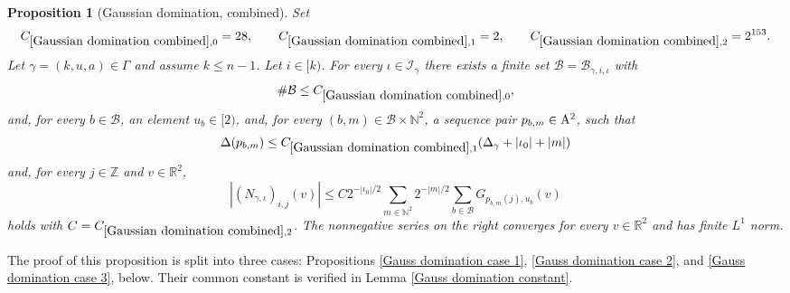 \documentclass[12pt,reqno]{amsart}
\theoremstyle{plain}
\newtheorem{proposition}[theorem]{Proposition}
\numberwithin{equation}{section}
\theoremstyle{remark}
\newcommand{\uses}[1]{}
\newcommand{\usesdefs}[1]{}
\newcommand{\Z}{{\mathbb Z}}
\newcommand{\R}{{\mathbb R}}
\newcommand{\N}{{\mathbb N}}
\begin{document}
\begin{proposition}[Gaussian domination, combined]\label{Gaussian domination combined}\uses{Gauss domination case 1,Gauss domination case 2,Gauss domination case 3,Gauss domination constant}\usesdefs{multiplicatively spaced monotone sequences,geometric parameters,2D Gaussians,L multiplier,N multiplier}
Set
\begin{equation}\label{Gaussian domination combined constants}
C_{\ref{Gaussian domination combined},0}=28,\qquad
C_{\ref{Gaussian domination combined},1}=2,\qquad
C_{\ref{Gaussian domination combined},2}=2^{153}.
\end{equation}\label{auto:Gaussian-domination-combined-distance-constant}\label{auto:Gaussian-domination-combined-majorant-constant}
Let $\gamma=(k,u,a)\in\Gamma$ and assume $k\le n-1$. Let $i\in[k)$. For every $\iota\in\mathcal I_\gamma$ there exists a finite set $\mathcal B=\mathcal B_{\gamma,i,\iota}$ with
\begin{equation}\label{auto:Gaussian-domination-index-cardinality}
\#\mathcal B\le C_{\ref{Gaussian domination combined},0},
\end{equation}
and, for every $b\in\mathcal B$, an element $u_b\in[2)$, and, for every $(b,m)\in\mathcal B\times\N^2$, a sequence pair $p_{b,m}\in{\rm A}^2$, such that
\begin{equation}\label{Gaussian domination combined distance}
\Delta(p_{b,m})\le C_{\ref{Gaussian domination combined},1}(\Delta_\gamma+|\iota_0|+|m|)
\end{equation}
and, for every $j\in\Z$ and $v\in\R^2$,
\begin{equation}\label{Gaussian domination main estimate}
|(N_{\gamma,\iota})_{i,j}(v)|
\le C 2^{-|\iota_0|/2}
\sum_{m\in\N^2}2^{-|m|/2}
\sum_{b\in\mathcal B}G_{p_{b,m}(j),u_b}(v)
\end{equation}
holds with $C=C_{\ref{Gaussian domination combined},2}$.
The nonnegative series on the right converges for every $v\in\R^2$ and has finite $L^1$ norm.
\end{proposition}

The proof of this proposition is split into three cases: Propositions \ref{Gauss domination case 1}, \ref{Gauss domination case 2}, and \ref{Gauss domination case 3}, below. Their common constant is verified in Lemma \ref{Gauss domination constant}.
\end{document}
